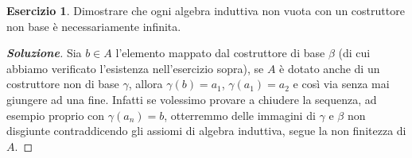 \documentclass{article}
\theoremstyle{definition}
\newtheorem{esercizio}{Esercizio}
\theoremstyle{definition}
\theoremstyle{definition}
\theoremstyle{remark}
\begin{document}
\begin{esercizio}
    Dimostrare che ogni algebra induttiva non vuota con un
    costruttore non base è necessariamente infinita.
\end{esercizio}
\begin{proof}[\textbf{Soluzione}] Sia $b\in A$  l'elemento mappato dal costruttore di base $\beta$ (di cui abbiamo
    verificato l'esistenza nell'esercizio sopra), se $A$ è dotato anche di un costruttore
    non di base $\gamma$, allora $\gamma(b) = a_1$, $\gamma(a_1) = a_2$ e così via senza mai giungere ad una fine.
    Infatti se volessimo provare a chiudere la sequenza, ad esempio proprio con $\gamma(a_n)=b$, otterremmo delle
    immagini di $\gamma$ e $\beta$ non disgiunte contraddicendo gli assiomi di algebra induttiva, segue la non finitezza di $A$.
\end{proof}
\end{document}
